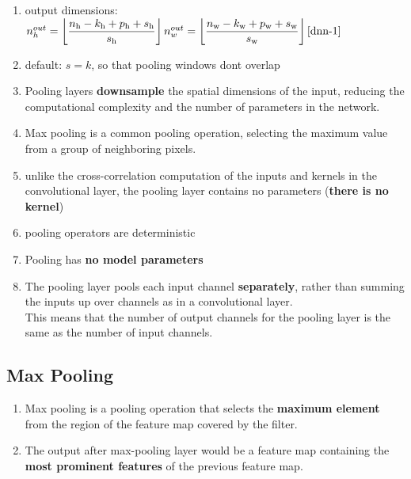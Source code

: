 \begin{enumerate}
    \item[] output dimensions: 
    $
        \hfill
        n^{out}_h=\dfloor{\dfrac{n_\textrm{h}-k_\textrm{h}+p_\textrm{h}+s_\textrm{h}}{s_\textrm{h}}}
        \hfill 
        n^{out}_w=\dfloor{\dfrac{n_\textrm{w}-k_\textrm{w}+p_\textrm{w}+s_\textrm{w}}{s_\textrm{w}}}
        \hfill
        \text{\cite{dnn-1}}
    $
    
    \item default: $s=k$, so that pooling windows dont overlap

    \item Pooling layers \textbf{downsample} the spatial dimensions of the input, reducing the computational complexity and the number of parameters in the network. 
    
    \item Max pooling is a common pooling operation, selecting the maximum value from a group of neighboring pixels.

    \item unlike the cross-correlation computation of the inputs and kernels in the convolutional layer, the pooling layer contains no parameters (\textbf{there is no kernel})

    \item pooling operators are deterministic

    \item Pooling has \textbf{no model parameters}

    \item The pooling layer pools each input channel \textbf{separately}, rather than summing the inputs up over channels as in a convolutional layer.\\
    This means that the number of output channels for the pooling layer is the same as the number of input channels.
\end{enumerate}


\subsection{Max Pooling \cite{gfg-cnn-introduction-to-pooling-layer,dnn-1}} \label{cnn: Max Pooling}

\begin{enumerate}
    \item Max pooling is a pooling operation that selects the \textbf{maximum element} from the region of the feature map covered by the filter. 
    
    \item The output after max-pooling layer would be a feature map containing the \textbf{most prominent features} of the previous feature map.
\end{enumerate}

